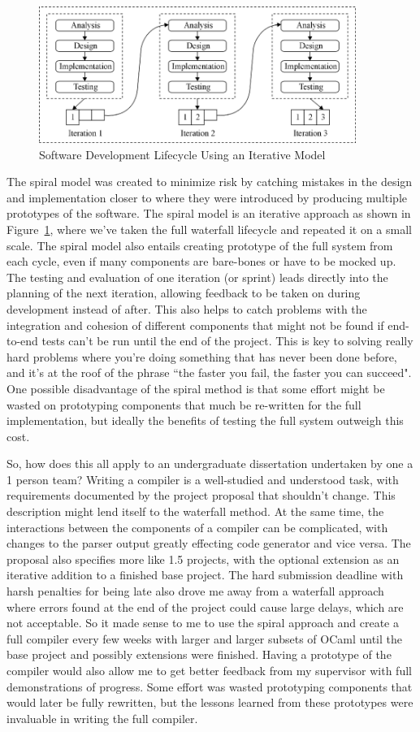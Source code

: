 \documentclass[12pt,a4paper,twoside,openright]{report}
\begin{document}
\begin{figure}[tbh]
\centerline{\includegraphics[height=1.75in]{iterative}}
\caption{Software Development Lifecycle Using an Iterative Model}
\label{iterativefig}
\end{figure}
The spiral model was created to minimize risk by catching mistakes in the design and implementation closer to where they were introduced by producing multiple prototypes of the software.
The spiral model is an iterative approach as shown in Figure~\ref{iterativefig}, where we've taken the full waterfall lifecycle and repeated it on a small scale.
The spiral model also entails creating prototype of the full system from each cycle, even if many components are bare-bones or have to be mocked up.
The testing and evaluation of one iteration (or sprint) leads directly into the planning of the next iteration, allowing feedback to be taken on during development instead of after.
This also helps to catch problems with the integration and cohesion of different components that might not be found if end-to-end tests can't be run until the end of the project.
This is key to solving really hard problems where you're doing something that has never been done before, and it's at the roof of the phrase ``the faster you fail, the faster you can succeed".
One possible disadvantage of the spiral method is that some effort might be wasted on prototyping components that much be re-written for the full implementation, but ideally the benefits of testing the full system outweigh this cost.

So, how does this all apply to an undergraduate dissertation undertaken by one a 1 person team?
Writing a compiler is a well-studied and understood task, with requirements documented by the project proposal that shouldn't change.
This description might lend itself to the waterfall method.
At the same time, the interactions between the components of a compiler can be complicated, with changes to the parser output greatly effecting code generator and vice versa.
The proposal also specifies more like 1.5 projects, with the optional extension as an iterative addition to a finished base project.
The hard submission deadline with harsh penalties for being late also drove me away from a waterfall approach where errors found at the end of the project could cause large delays, which are not acceptable.
So it made sense to me to use the spiral approach and create a full compiler every few weeks with larger and larger subsets of OCaml until the base project and possibly extensions were finished.
Having a prototype of the compiler would also allow me to get better feedback from my supervisor with full demonstrations of progress.
Some effort was wasted prototyping components that would later be fully rewritten, but the lessons learned from these prototypes were invaluable in writing the full compiler.
\end{document}
